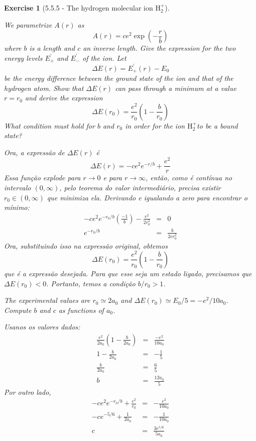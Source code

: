 \documentclass[12pt]{article}
\def\be{\begin{equation}}
\def\ee{\end{equation}}
\def\bea{\begin{eqnarray*}}
\def\eea{\end{eqnarray*}}
\def\f{\frac}
\def\l{\left}
\def\r{\right}
\newtheorem{exercise}{Exercise}
\begin{document}
\begin{exercise}[5.5.5 - The hydrogen molecular ion $\mathrm{H}_{2}^{+}$]
\begin{exercises}
			\item We parametrize $A(r)$ as
			$$
			A(r)=c e^{2} \exp \left(-\frac{r}{b}\right)
			$$
			where $b$ is a length and $c$ an inverse length. Give the expression for the two energy levels $E_{+}^{\prime}$ and $E_{-}^{\prime}$ of the ion. Let
			$$
			\Delta E(r)=E_{+}^{\prime}(r)-E_{0}
			$$
			be the energy difference between the ground state of the ion and that of the hydrogen atom. Show that $\Delta E(r)$ can pass through a minimum at a value $r=r_{0}$ and derive the expression
			$$
			\Delta E\left(r_{0}\right)=\frac{e^{2}}{r_{0}}\left(1-\frac{b}{r_{0}}\right)
			$$
			What condition must hold for $b$ and $r_{0}$ in order for the ion $\mathrm{H}_{2}^{+}$to be a bound state?
			\begin{multianswer}
				Ora, a expressão de $\Delta E(r)$ é
				\be
					\Delta E(r) = -ce^2 e^{-r/b} + \f{e^2}{r}
				\ee
				Essa função explode para $r\to0$ e para $r\to\infty$, então, como é contínua no intervalo $(0, \infty)$, pelo teorema do valor intermediário, precisa existir $r_0\in(0, \infty)$ que minimiza ela. Derivando e igualando a zero para encontrar o mínimo:
				\bea
					-ce^2 e^{-r_0/b} \l(\f{-1}{b}\r) - \f{e^2}{2r_0^2} &=& 0 \\
					e^{-r_0/b} &=& \f{b}{2c r_0^2}
				\eea
				Ora, substituindo isso na expressão original, obtemos
				\be
				\Delta E(r_0) = \frac{e^{2}}{r_{0}}\left(1-\frac{b}{r_{0}}\right)
				\ee
				que é a expressão desejada. Para que esse seja um estado ligado, precisamos que $\Delta E(r_0) < 0$. Portanto, temos a condição $b/r_0 > 1$. 
			\end{multianswer}
			
			\item The experimental values are $r_{0} \simeq 2 a_{0}$ and $\Delta E\left(r_{0}\right) \simeq E_{0} / 5=-e^{2} / 10 a_{0}$. Compute $b$ and $c$ as functions of $a_{0}$.
			\begin{multianswer}[true]
				Usanos os valores dados:
				\bea
					\f{e^2}{2a_0}\l( 1 - \f{b}{2a_0}\r) &=& \f{-e^2}{10a_0} \\
					1-\f{b}{2a_0} &=& -\f{1}{5} \\
					\f{b}{2a_0} &=& \f{6}{5} \\
					b &=& \f{12a_0}{5}
				\eea
				Por outro lado,
				\bea
					-ce^2e^{-r_0/b} + \f{e^2}{r_0} &=& -\f{e^2}{10a_0} \\
					-ce^{-5/6} + \f{1}{2a_0} &=& -\f{1}{10a_0} \\
					c &=& \f{3e^{5/6}}{5a_0}
				\eea
			\end{multianswer}
		\end{exercises}
	\end{exercise}
	
\end{document}
